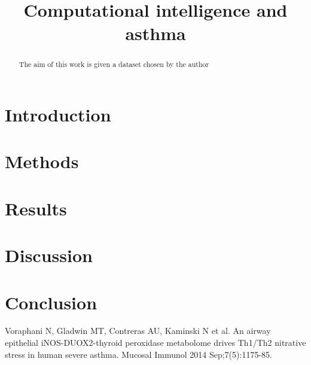 \documentclass[conference,a4paper]{IEEEtran}
\title{Computational intelligence and asthma}
\author{\IEEEauthorblockN{Pablo Vicente-Munuera}
	\IEEEauthorblockA{Bioinformatics MSc\\
		Email: pablovm1990@gmail.com}
}
\begin{document}
\maketitle

\begin{abstract}

The aim of this work is given a dataset chosen by the author

\end{abstract}

\section{Introduction}

\section{Methods}

\section{Results}

\section{Discussion}

\section{Conclusion}

\begin{thebibliography}{1}
	
	 Voraphani N, Gladwin MT, Contreras AU, Kaminski N et al. An airway epithelial iNOS-DUOX2-thyroid peroxidase metabolome drives Th1/Th2 nitrative stress in human severe asthma. Mucosal Immunol 2014 Sep;7(5):1175-85.
	
	
\end{thebibliography}
\end{document}
